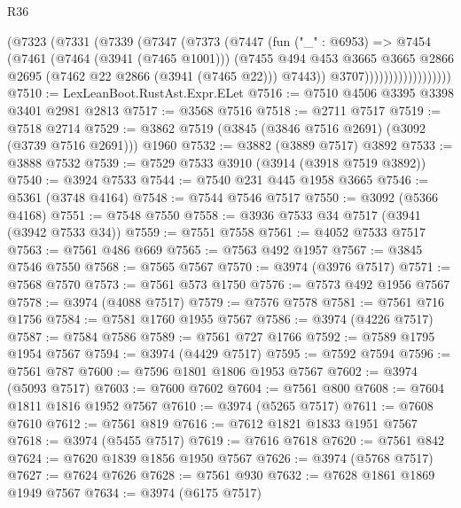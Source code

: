 \begin{lexlean}{R36}
\begin{coremodule}
                          (@7323
                            (@7331
                              (@7339
                                (@7347
                                  (@7373
                                    (@7447
                                      (fun ("_" : @6953) =>
                                      @7454
                                        (@7461
                                          (@7464 (@3941 (@7465 @1001)))
                                          (@7455
                                            @494
                                            @453
                                            @3665
                                            @3665
                                            @2866
                                            @2695
                                            (@7462 @22 @2866 (@3941 (@7465 @22)))
                                            @7443))
                                        @3707))))))))))))))))))
@7510 := LexLeanBoot.RustAst.Expr.ELet
@7516 := @7510 @4506 @3395 @3398 @3401 @2981 @2813
@7517 := @3568 @7516
@7518 := @2711 @7517
@7519 := @7518 @2714
@7529 := @3862 @7519 (@3845 (@3846 @7516 @2691) (@3092 (@3739 @7516 @2691))) @1960
@7532 := @3882 (@3889 @7517) @3892
@7533 := @3888 @7532
@7539 := @7529 @7533 @3910 (@3914 (@3918 @7519 @3892))
@7540 := @3924 @7533
@7544 := @7540 @231 @445 @1958 @3665
@7546 := @5361 (@3748 @4164)
@7548 := @7544 @7546 @7517
@7550 := @3092 (@5366 @4168)
@7551 := @7548 @7550
@7558 := @3936 @7533 @34 @7517 (@3941 (@3942 @7533 @34))
@7559 := @7551 @7558
@7561 := @4052 @7533 @7517
@7563 := @7561 @486 @669
@7565 := @7563 @492 @1957
@7567 := @3845 @7546 @7550
@7568 := @7565 @7567
@7570 := @3974 (@3976 @7517)
@7571 := @7568 @7570
@7573 := @7561 @573 @1750
@7576 := @7573 @492 @1956 @7567
@7578 := @3974 (@4088 @7517)
@7579 := @7576 @7578
@7581 := @7561 @716 @1756
@7584 := @7581 @1760 @1955 @7567
@7586 := @3974 (@4226 @7517)
@7587 := @7584 @7586
@7589 := @7561 @727 @1766
@7592 := @7589 @1795 @1954 @7567
@7594 := @3974 (@4429 @7517)
@7595 := @7592 @7594
@7596 := @7561 @787
@7600 := @7596 @1801 @1806 @1953 @7567
@7602 := @3974 (@5093 @7517)
@7603 := @7600 @7602
@7604 := @7561 @800
@7608 := @7604 @1811 @1816 @1952 @7567
@7610 := @3974 (@5265 @7517)
@7611 := @7608 @7610
@7612 := @7561 @819
@7616 := @7612 @1821 @1833 @1951 @7567
@7618 := @3974 (@5455 @7517)
@7619 := @7616 @7618
@7620 := @7561 @842
@7624 := @7620 @1839 @1856 @1950 @7567
@7626 := @3974 (@5768 @7517)
@7627 := @7624 @7626
@7628 := @7561 @930
@7632 := @7628 @1861 @1869 @1949 @7567
@7634 := @3974 (@6175 @7517)

\end{coremodule}
\end{lexlean}
